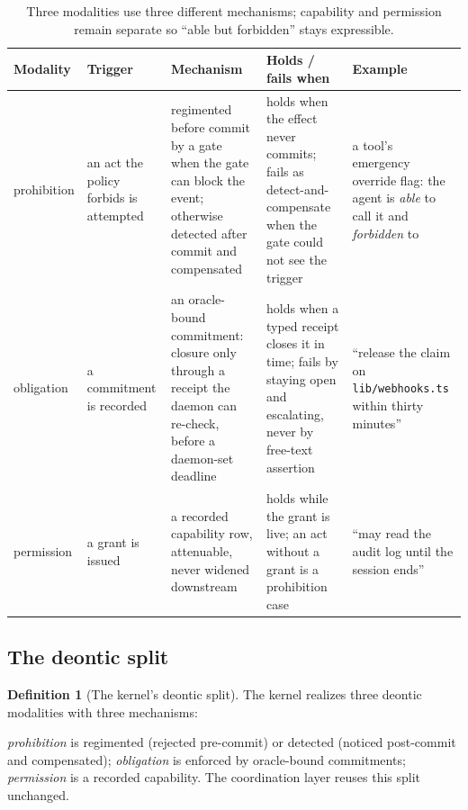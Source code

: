 \documentclass[11pt,a4paper]{article}
\theoremstyle{definition}
\newtheorem{definition}{Definition}[section]
\theoremstyle{remark}
\begin{document}
\begin{table}[H]
\centering
\caption{Three modalities use three different mechanisms; capability and
permission remain separate so ``able but forbidden'' stays expressible.}
\label{tab:swk-deontic-split}
\small
\renewcommand{\arraystretch}{1.18}
\begin{tabularx}{\textwidth}{@{}>{\raggedright\arraybackslash}p{} >{\raggedright\arraybackslash}p{} >{\raggedright\arraybackslash}X >{\raggedright\arraybackslash}X >{\raggedright\arraybackslash}p{}@{}}
\toprule
\textbf{Modality} & \textbf{Trigger} & \textbf{Mechanism} & \textbf{Holds / fails when} & \textbf{Example} \\
\midrule
prohibition & an act the policy forbids is attempted & regimented before commit by a gate when the gate can block the event; otherwise detected after commit and compensated & holds when the effect never commits; fails as detect-and-compensate when the gate could not see the trigger & a tool's emergency override flag: the agent is \emph{able} to call it and \emph{forbidden} to \\
obligation & a commitment is recorded & an oracle-bound commitment: closure only through a receipt the daemon can re-check, before a daemon-set deadline & holds when a typed receipt closes it in time; fails by staying open and escalating, never by free-text assertion & ``release the claim on \texttt{lib/\allowbreak webhooks.ts} within thirty minutes'' \\
permission & a grant is issued & a recorded capability row, attenuable, never widened downstream & holds while the grant is live; an act without a grant is a prohibition case & ``may read the audit log until the session ends'' \\
\bottomrule
\end{tabularx}
\end{table}

\subsection{The deontic split}

\begin{definition}[The kernel's deontic split]\label{def:deontic}
\setlength{\parskip}{4pt plus 1pt}
The kernel realizes three deontic modalities with three mechanisms:

\emph{prohibition} is regimented (rejected pre-commit) or detected (noticed
post-commit and compensated); \emph{obligation} is enforced by oracle-bound commitments;
\emph{permission} is a recorded capability. The coordination layer reuses this
split unchanged.
\end{definition}
\end{document}
